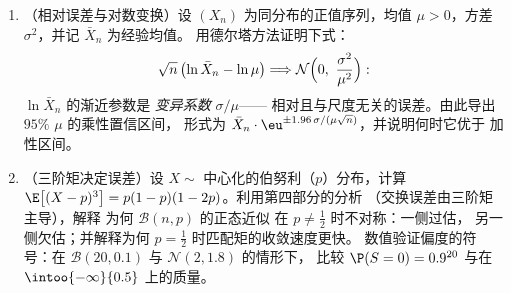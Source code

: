 \begin{problem}
\begin{enumerate}[resume]
  \item （相对误差与对数变换）设 $(X_n)$
        为同分布的正值序列，均值 $\mu > 0$，方差
        $\sigma^2$，并记 $\bar X_n$ 为经验均值。
        用德尔塔方法证明下式：
        \[
        \sqrt n\,\bigl(\ln\bar X_n - \ln\mu\bigr)
        \Longrightarrow
        \mathcal N\Bigl(0,\ \frac{\sigma^2}{\mu^2}\Bigr) :
        \]
        $\ln\bar X_n$ 的渐近参数是
        \emph{变异系数} $\sigma/\mu$——
        相对且与尺度无关的误差。由此导出 $95\%$
        $\mu$ 的乘性置信区间，
        形式为 $\bar X_n\cdot\eu^{\pm1.96\,\sigma/(\mu\sqrt
        n)}$，并说明何时它优于
        加性区间。
  \item （三阶矩决定误差）设 $X \sim$
        中心化的伯努利（$p$）分布，计算 $\E\bigl[(X -
        p)^3\bigr] = p(1-p)(1-2p)$。利用第四部分的分析
        （交换误差由三阶矩主导），解释
        为何 $\mathcal B(n, p)$ 的正态近似
        在 $p \neq \frac12$ 时不对称：一侧过估，
        另一侧欠估；并解释为何
        $p = \frac12$ 时匹配矩的收敛速度更快。
        数值验证偏度的符号：在 $\mathcal
        B(20, 0.1)$ 与 $\mathcal N(2, 1.8)$ 的情形下，
        比较 $\P(S = 0) = 0.9^{20}$ 与在
        $\intoo{-\infty}{0.5}$ 上的质量。
\end{enumerate}
\end{problem}
